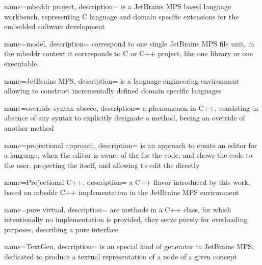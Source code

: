 {
  name=mbeddr project,
  description={ is a JetBrains MPS based language workbench, representing C language and domain specific
  extensions for the embedded software development}
}

{
  name=model,
  description={ correspond to one single JetBrains MPS file unit, in the mbeddr context it corresponds to C or C++ project, like one library or one executable.}
}

{
  name=JetBrains MPS,
  description={ is a language engineering environment 
  allowing to construct incrementally defined domain specific languages}
}

{
  name=override syntax absece,
  description={ a phenomenon in C++, consisting in absence of any syntax to explicitly designate a method, beeing an override
  of another method}
}



{
  name=projectional approach,
  description={ is an approach to create an editor for a language, when the editor is 
  aware of the  for the code, and shows the code to the user, projecting the 
   itself, and allowing to edit the  directly}
}

{
  name=Projectional C++,
  description={ a C++ flavor introduced by this work, based on mbeddr C++ implementation in the JetBrains MPS environment}
}

{
  name=pure virtual,
  description={ are methods in a C++ class, for which intentionally no implementation is provided, they serve purely for overloading purposes, 
  describing a pure interface}
}


{
  name=TextGen,
  description={ is an special kind of generator in JetBrains MPS, dedicated to produce a textual representation of a node of a given concept}
}
